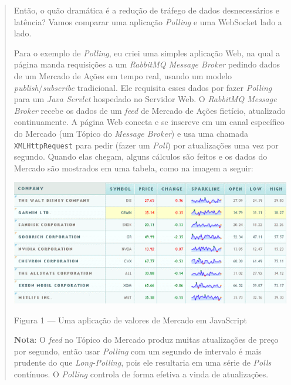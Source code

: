 \documentclass[a4paper,12pt]{article}
\newcommand{\code}[1]{\lstinline[mathescape=true, columns=fixed, basicstyle={\small\ttfamily}]{#1}}
\begin{document}
\begin{quotation}
Então, o quão dramática é a redução de tráfego de dados desnecessários e latência? Vamos comparar uma aplicação \emph{Polling} e uma WebSocket lado a lado.


Para o exemplo de \emph{Polling}, eu criei uma simples aplicação Web, na qual a página manda requisições a um \emph{RabbitMQ Message Broker} pedindo dados de um Mercado de Ações em tempo real, usando um modelo \emph{publish}/\emph{subscribe} tradicional. Ele requisita esses dados por fazer \emph{Polling} para um \emph{Java Servlet} hospedado no Servidor Web. O \emph{RabbitMQ Message Broker} recebe os dados de um \emph{feed} de Mercado de Ações fictício, atualizado continuamente. A página Web conecta e se inscreve em um canal específico do Mercado (um Tópico do \emph{Message Broker}) e usa uma chamada \code{XMLHttpRequest} para pedir (fazer um \emph{Poll}) por atualizações uma vez por segundo. Quando elas chegam, alguns cálculos são feitos e os dados do Mercado são mostrados em uma tabela, como na imagem a seguir:

\includegraphics[width=1\linewidth]{images/stock-ticker.png}


Figura 1 — Uma aplicação de valores de Mercado em JavaScript

\textbf{Nota}: O \emph{feed} no Tópico do Mercado produz muitas atualizações de preço por segundo, então usar \emph{Polling} com um segundo de intervalo é mais prudente do que \emph{Long-Polling}, pois ele resultaria em uma série de \emph{Polls} contínuos. O \emph{Polling} controla de forma efetiva a vinda de atualizações.


\end{quotation}
\end{document}
